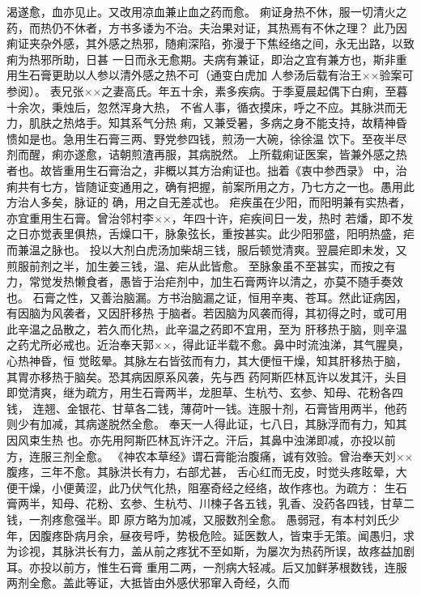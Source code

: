 \documentclass[a4paper,12pt,UTF8,twoside]{ctexbook}
\begin{document}
渴遂愈，血亦见止。又改用凉血兼止血之药而愈。 
痢证身热不休，服一切清火之药，而热仍不休者，方书多诿为不治。夫治果对证，其热焉有不休之理？ 
此乃因痢证夹杂外感，其外感之热邪，随痢深陷，弥漫于下焦经络之间，永无出路，以致痢为热邪所助，日甚 
一日而永无愈期。夫病有兼证，即治之宜有兼方也，斯非重用生石膏更助以人参以清外感之热不可（通变白虎加 
人参汤后载有治王××验案可参阅）。 
表兄张××之妻高氏。年五十余，素多疾病。于季夏晨起偶下白痢，至暮十余次，秉烛后，忽然浑身大热， 
不省人事，循衣摸床，呼之不应。其脉洪而无力，肌肤之热烙手。知其系气分热 
痢，又兼受暑，多病之身不能支持，故精神昏愦如是也。急用生石膏三两、野党参四钱，煎汤一大碗，徐徐温 
饮下。至夜半尽剂而醒，痢亦遂愈，诘朝煎渣再服，其病脱然。 
上所载痢证医案，皆兼外感之热者也。故皆重用生石膏治之，非概以其方治痢证也。拙着《衷中参西录》 
中，治痢共有七方，皆随证变通用之，确有把握，前案所用之方，乃七方之一也。愚用此方治人多矣，脉证的 
确，用之自无差忒也。 
疟疾虽在少阳，而阳明兼有实热者，亦宜重用生石膏。曾治邻村李××，年四十许，疟疾间日一发，热时 
若燔，即不发之日亦觉表里俱热，舌燥口干，脉象弦长，重按甚实。此少阳邪盛，阳明热盛，疟而兼温之脉也。 
投以大剂白虎汤加柴胡三钱，服后顿觉清爽。翌晨疟即未发，又煎服前剂之半，加生姜三钱，温、疟从此皆愈。 
至脉象虽不至甚实，而按之有力，常觉发热懒食者，愚皆于治疟剂中，加生石膏两许以清之，亦莫不随手奏效也。 
石膏之性，又善治脑漏。方书治脑漏之证，恒用辛夷、苍耳。然此证病因，有因脑为风袭者，又因肝移热 
于脑者。若因脑为风袭而得，其初得之时，或可用此辛温之品散之，若久而化热，此辛温之药即不宜用，至为 
肝移热于脑，则辛温之药尤所必戒也。近治奉天郭××，得此证半载不愈。鼻中时流浊涕，其气腥臭，心热神昏，恒 
觉眩晕。其脉左右皆弦而有力，其大便恒干燥，知其肝移热于脑，其胃亦移热于脑矣。恐其病因原系风袭，先与西 
药阿斯匹林瓦许以发其汗，头目即觉清爽，继为疏方，用生石膏两半，龙胆草、生杭芍、玄参、知母、花粉各四钱， 
连翘、金银花、甘草各二钱，薄荷叶一钱。连服十剂，石膏皆用两半，他药则少有加减，其病遂脱然全愈。 
奉天一人得此证，七八日，其脉浮而有力，知其因风束生热 
也。亦先用阿斯匹林瓦许汗之。汗后，其鼻中浊涕即减，亦投以前方，连服三剂全愈。 
《神农本草经》谓石膏能治腹痛，诚有效验。曾治奉天刘××腹疼，三年不愈。其脉洪长有力，右部尤甚， 
舌心红而无皮，时觉头疼眩晕，大便干燥，小便黄涩，此乃伏气化热，阻塞奇经之经络，故作疼也。为疏方∶ 
生石膏两半，知母、花粉、玄参、生杭芍、川楝子各五钱，乳香、没药各四钱，甘草二钱，一剂疼愈强半。即 
原方略为加减，又服数剂全愈。 
愚弱冠，有本村刘氏少年，因腹疼卧病月余，昼夜号呼，势极危险。延医数人，皆束手无策。闻愚归，求 
为诊视，其脉洪长有力，盖从前之疼犹不至如斯，为屡次为热药所误，故疼益加剧耳。亦投以前方，惟生石膏 
重用二两，一剂病大轻减。后又加鲜茅根数钱，连服两剂全愈。盖此等证，大抵皆由外感伏邪窜入奇经，久而 
\end{document}
